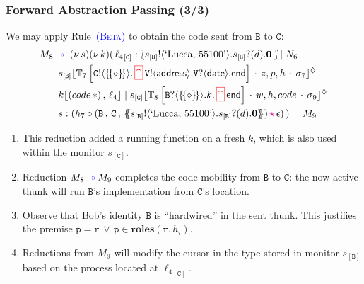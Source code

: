 \documentclass[12pt]{beamer}
\newcommand{\myctxr}[2]{{#1\left[\textcolor{black}{#2}\right]}}
\newcommand{\pS}{\ensuremath{\mathtt{V}}\xspace}
\newcommand{\thunkt}{\ensuremath\{\!\{\diamond\}\!\}}
\newcommand{\fwcolor}[1]{\textcolor{blue}{#1}}
\newcommand{\sepcolor}[1]{\textcolor{magenta}{#1}}
\newcommand{\sred}[1]{\textcolor{myred}{#1}}
\newcommand{\news}[1]{(\nu\, #1)}
\newcommand{\bi}{\begin{enumerate}[$\bullet$]}
\newcommand{\ei}{\end{enumerate}}
\newcommand{\queue}[1]{\lfloor #1 \rfloor}
\newcommand{\store}{\sigma}
\newcommand{\ctx}[1]{\mathbb{#1}}
\newcommand{\mysepp}{\,\cdot\,}
\newcommand{\mem}[3]{\ensuremath{#1\queue{#2\mysep #3}}}
\newcommand{\codah}[4]{\coda{#1}{(#2\,\history\,#3)\!#4}}
\newcommand{\history}{\sepcolor{\mathbf{\star}}}
\newcommand{\coda}[2]{#1:#2}
\newcommand{\lend}{\mathsf{end}}
\newcommand{\gpart}[1]{\mathtt{#1}}
\newcommand{\hmoni}[4]{\ensuremath{{#1\queue{\textcolor{black}{#2}\mysepp #3\mysepp #4}^{\normark}}}}
\newcommand{\past}{\,\text{\textcolor{red}{\textbf{\textasciicircum}}}\,}
\newcommand{\mypast}{\,\sred{\framebox[3mm]{\past}\,}}
\newcommand{\names}[1]{\mathtt{\mathbf{roles}}(#1)}
\newcommand{\conf}[2]{\lbag #2 \rbag} %
\newcommand{\ltout}[3]{\gpart{#1}!\langle#2\rangle.#3}
\newcommand{\ltinp}[3]{\gpart{#1}?\langle#2\rangle.#3}
\newcommand{\outses}{!}
\newcommand{\inpses}{?}
\newcommand{\Par}{\;|\;}
\newcommand{\emp}{\epsilon}
\newcommand{\valueq}[3]{(#1 \,,\, #2 \,,\,#3)}
\newcommand{\freev}[1]{\langle #1\rangle}
\newcommand{\boundv}[1]{(#1)}
\newcommand{\shsep}{.}
\newcommand{\cons}{\circ}
\newcommand{\appl}[2]{#1\, {#2}}
\newcommand{\bout}[2]{#1 \outses \freev{#2} \shsep}
\newcommand{\binp}[2]{#1 \inpses \boundv{#2} \shsep}
\newcommand{\fw}{\ensuremath{\fwcolor{\,\twoheadrightarrow\,}}}
\newcommand{\p}{\ensuremath{\mathtt{p}}\xspace}
\newcommand{\er}{\ensuremath{\mathtt{r}}}
\newcommand{\key}[2]{#1_{[#2]}}
\newcommand{\np}[2]{#1:#2}
\newcommand{\ep}[2]{#1_{[#2]}}
\newcommand{\mysep}{\,,\,}
\newcommand{\loc}{\ell}
\newcommand{\normark}{\lozenge}
\newcommand{\inact}{\mathbf{0}}
\newcommand{\epB}{\ep{s}{\mathtt{B}}}
\newcommand{\pB}{\ensuremath{\mathtt{B}}\xspace}
\newcommand{\pC}{\ensuremath{\mathtt{C}}\xspace}
\newcommand{\thunkp}[1]{\ensuremath\{\!\!\{#1\}\!\!\}}
\newcommand{\dummyn}{\ensuremath{\ast}}
\begin{document}
\begin{frame}
\frametitle{Forward Abstraction Passing (3/3)}
We may apply Rule~\fwcolor{\textsc{(Beta)}} to obtain the code sent from \pB to \pC:
\begin{align*}
M_8 & \fw ~   \news{s}\news{k}(\,  
\np{\key{{\loc_4}}{\pC}}{\conf{\inact}{\bout{\epB}{\text{`Lucca, 55100'}}\binp{\epB}{d}\inact}} 
\!\!  \Par N_6 
\\
& \!\!\Par \hmoni{\ep{s}{\pB}}{\myctxr{\ctx{T}_7}{\ltout{C}{\thunkt}{\mypast\ltout{\pS}{\mathsf{address}}{\ltinp{\pS}{\mathsf{date}}{\lend}}}}}{z,p,h}{\store_7} 
\\
& \!\!\Par 
\mem{k}{(\appl{code}{\dummyn})}{{\loc_4}} 
\Par 
\hmoni{\ep{s}{\pC}}{\myctxr{\ctx{T}_8}{ \ltinp{B}{\thunkt}{k.\mypast\lend}}}{w,h,code}{\store_9} 
\\
& 
\!\!\Par \codah{s}{h_7 \cons \valueq{\pB}{\pC}{\thunkp{\bout{\epB}{\text{`Lucca, 55100'}}\binp{\epB}{d}\inact}}}{\emp}{}~) 
= M_9
\end{align*}
\vspace{-3mm}
\bi
\item This reduction added a running function on a fresh 
$k$, which is also used within the monitor $\ep{s}{\pC}$.

\item Reduction $M_8 \fw M_9$ completes the code mobility from $\pB$ to $\pC$: the now active thunk
will run $\pB$'s implementation from $\pC$'s location. 
\item Observe that Bob's identity \pB is ``hardwired'' in the sent thunk. 
This justifies the premise 
$\p = \er \,\vee\, \p \in \names{\er, h_i}$.
\item Reductions from $M_9$ will  modify the cursor in the type stored in monitor $\ep{s}{\pB}$
based on the process located at $\key{{\loc_4}}{\pC}$.
\ei
\end{frame}
\end{document}
